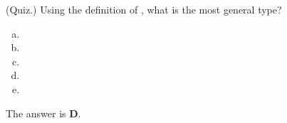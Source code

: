 \documentclass[letterpaper]{article}
\begin{document}
\begin{mdframed}[]
    (Quiz.) Using the definition of , what is the most general type? 
    \begin{enumerate}[(a)]
        \item {}
        \item {}
        \item {}
        \item {}
        \item {}
    \end{enumerate}

    \begin{mdframed}[]
        The answer is \textbf{D}.
    \end{mdframed}
\end{mdframed}
\end{document}
